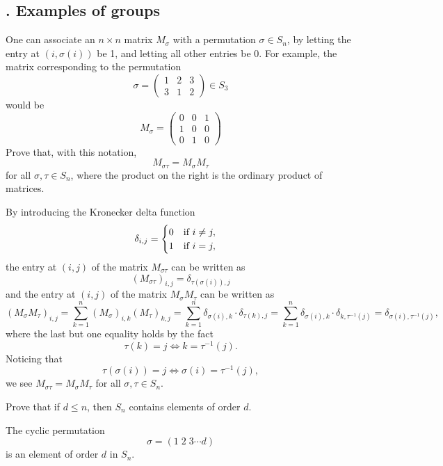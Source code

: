 \documentclass[12pt,letterpaper,boxed]{hmcpset}
\begin{document}
\subsection{. Examples of groups}
\begin{problem}[2.1]
	One can associate an $n\times n$ matrix $M_\sigma$ with a permutation $\sigma \in S_n$, by
	letting the entry at $(i, \sigma(i))$ be 1, and letting all other entries be 0. For example,
	the matrix corresponding to the permutation
	\[
	\sigma=\left(
	\begin{matrix}	
	1 & 2 & 3\\	
    3 & 1 & 2	
	\end{matrix}
	\right)\in S_3
	\]
	would be 
	\[
	M_\sigma=\left(
	\begin{matrix}	
	0 & 0 & 1\\	
	1 & 0 & 0\\	
	0 & 1 & 0
	\end{matrix}
	\right)
	\]
	Prove that, with this notation,
	\[
	M_{\sigma\tau}=M_{\sigma}M_{\tau}
	\]
	for all $\sigma,\tau\in S_n$, where the product on the right is the ordinary product of matrices.
\end{problem}
\begin{solution}
	By introducing the Kronecker delta function	
    \[
    \delta _{{i,j}}=
    	\begin{cases}
    	0{\text{\quad if }}i\neq j,\\
    	1{\text{\quad if }}i=j,
    	\end{cases}
    \]
	the entry at $(i,j)$ of the matrix $M_{\sigma\tau}$ can be written as
	\[
	(M_{\sigma\tau})_{i,j}=\delta_{\tau(\sigma(i)),j}
	\]
	and the entry at $(i,j)$ of the matrix $M_{\sigma}M_{\tau}$ can be written as
	\[
	(M_{\sigma}M_{\tau})_{i,j}=\sum_{k=1}^{n}(M_{\sigma})_{i,k}(M_{\tau})_{k,j}=\sum_{k=1}^{n}\delta_{\sigma(i),k}\cdot\delta_{\tau(k),j}=\sum_{k=1}^{n}\delta_{\sigma(i),k}\cdot\delta_{k,\tau^{-1}(j)}=\delta_{\sigma(i),\tau^{-1}(j)},
	\]
	where the last but one equality holds by the fact 
	\[
	\tau(k)=j\iff k=\tau^{-1}(j).
	\]
	Noticing that
	\[
	\tau(\sigma(i))=j\iff \sigma(i)=\tau^{-1}(j),
	\]
    we see $M_{\sigma\tau}=M_{\sigma}M_{\tau}$
    for all $\sigma,\tau\in S_n$.
\end{solution}


\begin{problem}[2.2]
	Prove that if $d \le n$, then $S_n$ contains elements of order $d$.
\end{problem}
\begin{solution}
	The cyclic permutation 
	\[
	\sigma=(1\;2\;3\cdots d)
	\]
    is an element of order $d$ in $S_n$.
\end{solution}
\end{document}
